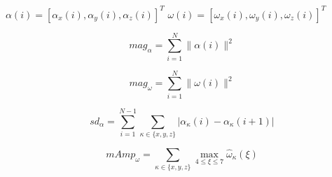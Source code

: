 $\alpha(i) = [\alpha_{x}(i),\alpha_{y}(i),\alpha_{z}(i)]^{T}$
$\omega(i) = [\omega_{x}(i),\omega_{y}(i),\omega_{z}(i)]^{T}$


\begin{equation}
mag_{\alpha} = \sum_{i=1}^{N} \|\alpha(i)\|^{2}
\end{equation}

\begin{equation}
mag_{\omega} = \sum_{i=1}^{N} \|\omega(i)\|^{2}
\end{equation}

\begin{equation}
sd_{\alpha} = \sum_{i=1}^{N-1}\sum_{\kappa \in \{x,y,z\}} |\alpha_{\kappa}(i) - \alpha_{\kappa}(i+1)|
\end{equation}

\begin{equation}
mAmp_{\omega} = \sum_{\kappa \in \{x,y,z\}} \max_{4 \leq \xi \leq 7} \hat{\omega}_{\kappa}(\xi)
\end{equation}




